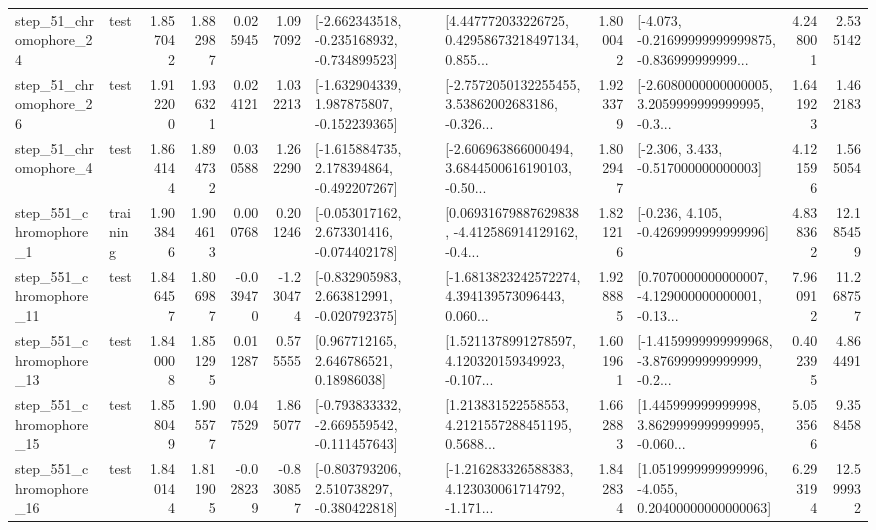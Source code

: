 \begin{tabular}{llrrrrllrlrr}
   step\_51\_chromophore\_24 &      test &      1.857042 &    1.882987 &      0.025945 &  1.097092 &  [-2.662343518, -0.235168932, -0.734899523] &  [4.447772033226725, 0.42958673218497134, 0.855... &       1.800042 &  [-4.073, -0.21699999999999875, -0.836999999999... &            4.248001 &          2.535142 \\
   step\_51\_chromophore\_26 &      test &      1.912200 &    1.936321 &      0.024121 &  1.032213 &   [-1.632904339, 1.987875807, -0.152239365] &  [-2.7572050132255455, 3.53862002683186, -0.326... &       1.923379 &  [-2.6080000000000005, 3.2059999999999995, -0.3... &            1.641923 &          1.462183 \\
    step\_51\_chromophore\_4 &      test &      1.864144 &    1.894732 &      0.030588 &  1.262290 &   [-1.615884735, 2.178394864, -0.492207267] &  [-2.606963866000494, 3.6844500616190103, -0.50... &       1.802947 &                [-2.306, 3.433, -0.517000000000003] &            4.121596 &          1.565054 \\
   step\_551\_chromophore\_1 &  training &      1.903846 &    1.904613 &      0.000768 &  0.201246 &   [-0.053017162, 2.673301416, -0.074402178] &  [0.06931679887629838, -4.412586914129162, -0.4... &       1.821216 &               [-0.236, 4.105, -0.4269999999999996] &            4.838362 &         12.185459 \\
  step\_551\_chromophore\_11 &      test &      1.846457 &    1.806987 &     -0.039470 & -1.230474 &   [-0.832905983, 2.663812991, -0.020792375] &  [-1.6813823242572274, 4.394139573096443, 0.060... &       1.928885 &  [0.7070000000000007, -4.129000000000001, -0.13... &            7.960912 &         11.268757 \\
  step\_551\_chromophore\_13 &      test &      1.840008 &    1.851295 &      0.011287 &  0.575555 &      [0.967712165, 2.646786521, 0.18986038] &  [1.5211378991278597, 4.120320159349923, -0.107... &       1.601961 &  [-1.4159999999999968, -3.876999999999999, -0.2... &            0.402395 &          4.864491 \\
  step\_551\_chromophore\_15 &      test &      1.858049 &    1.905577 &      0.047529 &  1.865077 &  [-0.793833332, -2.669559542, -0.111457643] &  [1.213831522558553, 4.2121557288451195, 0.5688... &       1.662883 &  [1.445999999999998, 3.8629999999999995, -0.060... &            5.053566 &          9.358458 \\
  step\_551\_chromophore\_16 &      test &      1.840144 &    1.811905 &     -0.028239 & -0.830857 &   [-0.803793206, 2.510738297, -0.380422818] &  [-1.216283326588383, 4.123030061714792, -1.171... &       1.842834 &  [1.0519999999999996, -4.055, 0.20400000000000063] &            6.293194 &         12.599932 \\

\end{tabular}
